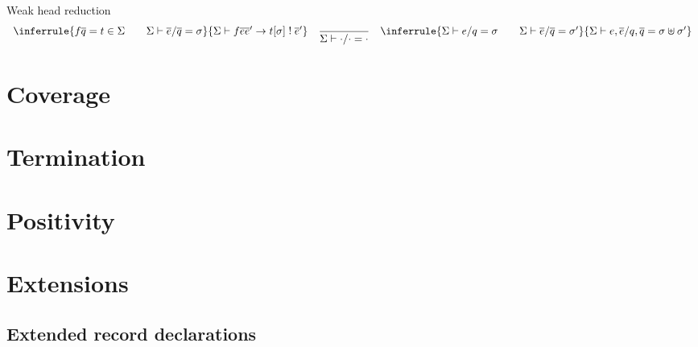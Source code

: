 \documentclass[acmlarge,fleqn]{acmart}\settopmatter{}
\begin{document}

Weak head reduction 
\[
\begin{array}{lll}
\inferrule{f \overline q = t \in \Sigma \qquad \Sigma \vdash \overline{e}/\overline{q} = \sigma}
{\Sigma \vdash f \overline{e} \overline{e}' \to t[\sigma] \bang \overline{e}'}
&
\ru{}
{\Sigma \vdash \cdot/\cdot = \cdot} %
&
\inferrule{\Sigma \vdash e/q = \sigma \qquad \Sigma \vdash \overline{e}/\overline{q} = \sigma'}
{\Sigma \vdash e, \overline{e}/q, \overline{q} = \sigma \uplus \sigma'}%
\end{array}
\]



\section{Coverage}
\label{sec:coverage}

\section{Termination}
\label{sec:termination}

\section{Positivity}
\label{sec:positivity}

\section{Extensions}
\label{sec:extensions}

\subsection{Extended record declarations}
\end{document}

